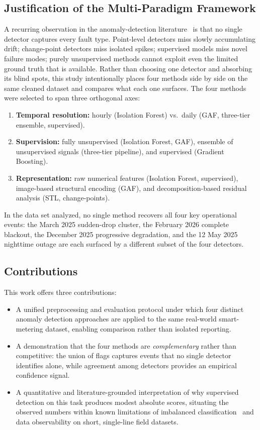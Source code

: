 \documentclass{article}
\begin{document}
\subsection*{Justification of the Multi-Paradigm Framework}
A recurring observation in the anomaly-detection literature~\cite{chandola2009anomaly,aggarwal2017outlier,aggarwal2017ensemble} is that no single detector captures every fault type. Point-level detectors miss slowly accumulating drift; change-point detectors miss isolated spikes; supervised models miss novel failure modes; purely unsupervised methods cannot exploit even the limited ground truth that is available. Rather than choosing one detector and absorbing its blind spots, this study intentionally places four methods side by side on the same cleaned dataset and compares what each one surfaces. The four methods were selected to span three orthogonal axes:

\begin{enumerate}[leftmargin=1.5em,itemsep=1pt]
  \item \textbf{Temporal resolution:} hourly (Isolation Forest) vs.\ daily (GAF, three-tier ensemble, supervised).
  \item \textbf{Supervision:} fully unsupervised (Isolation Forest, GAF), ensemble of unsupervised signals (three-tier pipeline), and supervised (Gradient Boosting).
  \item \textbf{Representation:} raw numerical features (Isolation Forest, supervised), image-based structural encoding (GAF), and decomposition-based residual analysis (STL, change-points).
\end{enumerate}
In the data set analyzed, no single method recovers all four key operational events: the March 2025 sudden-drop cluster, the February 2026 complete blackout, the December 2025 progressive degradation, and the 12 May 2025 nighttime outage are each surfaced by a different subset of the four detectors.

\subsection*{Contributions}
This work offers three contributions:

\begin{itemize}[leftmargin=1.5em,itemsep=1pt]
  \item A unified preprocessing and evaluation protocol under which four distinct anomaly detection approaches are applied to the same real-world smart-metering dataset, enabling comparison rather than isolated reporting.
  \item A demonstration that the four methods are \emph{complementary} rather than competitive: the union of flags captures events that no single detector identifies alone, while agreement among detectors provides an empirical confidence signal.
  \item A quantitative and literature-grounded interpretation of why supervised detection on this task produces modest absolute scores, situating the observed numbers within known limitations of imbalanced classification~\cite{saito2015precision,hand2009measuring} and data observability on short, single-line field datasets.
\end{itemize}
\end{document}
